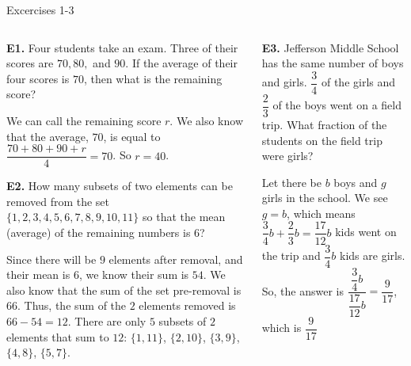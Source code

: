 \documentclass[9pt,aspectratio=169]{beamer}
\begin{document}
\begin{frame}{Excercises 1-3}
  \begin{columns}[T]
    \begin{column}{0.5\textwidth}
      \begin{problem}
        \textbf{E1.} Four students take an exam. Three of their scores are $70, 80,$ and $90$. If the average of their four scores is $70$, then what is the remaining score?
      \end{problem}
      We can call the remaining score $r$. We also know that the average, $70$, is equal to $\dfrac{70 + 80 + 90 + r}{4}=70$. So $r = \boxed{40}$.
      \begin{problem}
        \textbf{E2.} How many subsets of two elements can be removed from the set $\{1, 2, 3, 4, 5, 6, 7, 8, 9, 10, 11\}$ so that the mean (average) of the remaining numbers is $6$?
      \end{problem}
      Since there will be $9$ elements after removal, and their mean is $6$, we know their sum is $54$. We also know that the sum of the set pre-removal is $66$. Thus, the sum of the $2$ elements removed is $66-54=12$. There are only $\boxed{5}$ subsets of $2$ elements that sum to $12$: $\{1,11\}$, $\{2,10\}$, $\{3, 9\}$, $\{4, 8\}$, $\{5, 7\}$.
    \end{column}
    \begin{column}{0.5\textwidth}
      \begin{problem}
        \textbf{E3.} Jefferson Middle School has the same number of boys and girls. $\dfrac{3}{4}$ of the girls and $\dfrac{2}{3}$ of the boys went on a field trip. What fraction of the students on the field trip were girls?
      \end{problem}
      Let there be $b$ boys and $g$ girls in the school. We see $g=b$, which means $\dfrac{3}{4}b+\dfrac{2}{3}b=\dfrac{17}{12}b$ kids went on the trip and $\dfrac{3}{4}b$ kids are girls. So, the answer is $\dfrac{\dfrac{3}{4}b}{\dfrac{17}{12}b}=\dfrac{9}{17}$, which is $\boxed{\dfrac{9}{17}}$
    \end{column}
  \end{columns}
\end{frame}
\end{document}
